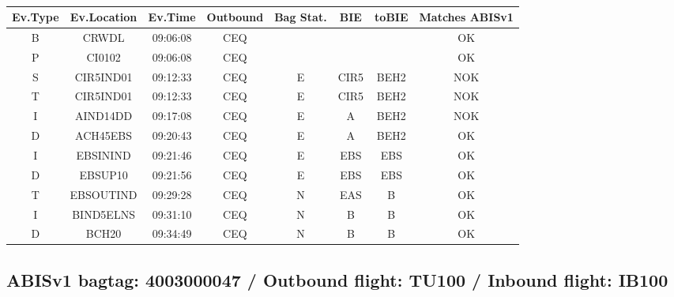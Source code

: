 \documentclass{report}
\begin{document}
\paragraph{}
\begin{longtable}{cccccccc}    \toprule
\rowcolor{white!50}
\textbf{Ev.Type} & \textbf{Ev.Location} & \textbf{Ev.Time} & \textbf{Outbound} & \textbf{Bag Stat.} & \textbf{BIE} & \textbf{toBIE} & \textbf{Matches ABISv1} \\\midrule
B & CRWDL & 09:06:08  & CEQ &  &  &  & OK\\
P & CI0102 & 09:06:08  & CEQ &  &  &  & OK\\
S & CIR5IND01 & 09:12:33  & CEQ & E & CIR5 & BEH2 & NOK\\
T & CIR5IND01 & 09:12:33  & CEQ & E & CIR5 & BEH2 & NOK\\
I & AIND14DD & 09:17:08  & CEQ & E & A & BEH2 & NOK\\
D & ACH45EBS & 09:20:43  & CEQ & E & A & BEH2 & OK\\
I & EBSININD & 09:21:46  & CEQ & E & EBS & EBS & OK\\
D & EBSUP10 & 09:21:56  & CEQ & E & EBS & EBS & OK\\
T & EBSOUTIND & 09:29:28  & CEQ & N & EAS & B & OK\\
I & BIND5ELNS & 09:31:10  & CEQ & N & B & B & OK\\
D & BCH20 & 09:34:49  & CEQ & N & B & B & OK\\
\bottomrule
\end{longtable}
\subsection*{ABISv1 bagtag: 4003000047 / Outbound flight: TU100 / Inbound flight: IB100}
\end{document}
